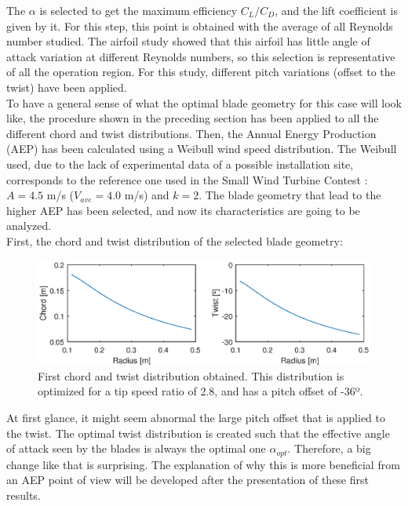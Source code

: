 \documentclass[../TFG_Report.tex]{subfiles}
\begin{document}
The $\alpha$ is selected to get the maximum efficiency $C_L/C_D$, and the lift coefficient is given by it. For this step, this point is obtained with the average of all Reynolds number studied. The airfoil study showed that this airfoil has little angle of attack variation at different Reynolds numbers, so this selection is representative of all the operation region. For this study, different pitch variations (offset to the twist) have been applied. \\


To have a general sense of what the optimal blade geometry for this case will look like, the procedure shown in the preceding section has been applied to all the different chord and twist distributions. Then, the Annual Energy Production (AEP) has been calculated using a Weibull wind speed distribution. The Weibull used, due to the lack of experimental data of a possible installation site, corresponds to the reference one used in the Small Wind Turbine Contest \cite{SWTContest}: $A=4.5$ m/s ($V_{ave}=4.0$ m/s) and $k=2$. The blade geometry that lead to the higher AEP has been selected, and now its characteristics are going to be analyzed. \\

First, the chord and twist distribution of the selected blade geometry: 

\begin{figure}[h!]
	\centering
	\includegraphics[width=1\linewidth]{Images/Aerodynamic_Design/First_Chord_Twist}
	\caption[First chord and twist distribution obtained]{First chord and twist distribution obtained. This distribution is optimized for a tip speed ratio of 2.8, and has a pitch offset of -36º.}
	\label{fig:ChordTwistFirst}
\end{figure}

\FloatBarrier

At first glance, it might seem abnormal the large pitch offset that is applied to the twist. The optimal twist distribution is created such that the effective angle of attack seen by the blades is always the optimal one $\alpha_{opt}$. Therefore, a big change like that is surprising. The explanation of why this is more beneficial from an AEP point of view will be developed after the presentation of these first results. \\
\end{document}
